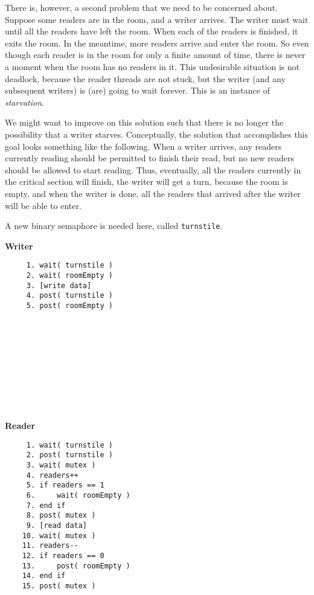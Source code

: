 There is, however, a second problem that we need to be concerned about. Suppose some readers are in the room, and a writer arrives. The writer must wait until all the readers have left the room. When each of the readers is finished, it exits the room. In the meantime, more readers arrive and enter the room. So even though each reader is in the room for only a finite amount of time, there is never a moment when the room has no readers in it. This undesirable situation is not deadlock, because the reader threads are not stuck, but the writer (and any subsequent writers) is (are) going to wait forever.
This is an instance of \textit{starvation}.

We might want to improve on this solution such that there is no longer the possibility that a writer starves.
Conceptually, the solution that accomplishes this goal looks something like the following.
When a writer arrives, any readers currently reading should be permitted to finish their read, but no new readers should be allowed to start reading. Thus, eventually, all the readers currently in the critical section will finish, the writer will get a turn, because the room is empty, and when the writer is done, all the readers that arrived after the writer will be able to enter.

A new binary semaphore is needed here, called \texttt{turnstile}.

\begin{multicols}{2}
	\textbf{Writer}\vspace{-2em}
	\begin{verbatim}
	 1. wait( turnstile )
	 2. wait( roomEmpty )
	 3. [write data]
	 4. post( turnstile )
	 5. post( roomEmpty )
	 
	 
	 
	 
	 
	 
	 
	 
	 
	 
  \end{verbatim}
	\columnbreak
	\textbf{Reader}\vspace{-2em}
	\begin{verbatim}
	 1. wait( turnstile )
	 2. post( turnstile )
	 3. wait( mutex )
	 4. readers++
	 5. if readers == 1
	 6.     wait( roomEmpty )
	 7. end if
	 8. post( mutex )
	 9. [read data]
	10. wait( mutex )
	11. readers--
	12. if readers == 0
	13.     post( roomEmpty )
	14. end if
	15. post( mutex )
  \end{verbatim}
\end{multicols}
\vspace{-2em}

